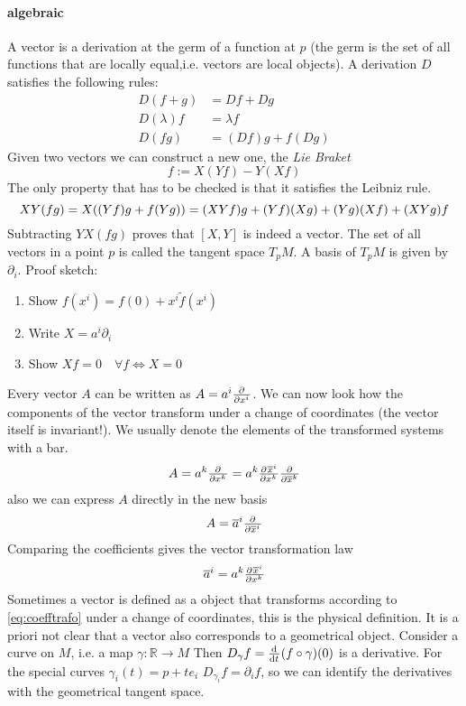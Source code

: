\paragraph{algebraic}
A vector is a derivation at the germ of a function at $p$ 
(the germ is the set of all functions that are locally equal,i.e. vectors are local objects). 
A derivation $D$ satisfies the following rules:
\begin{align*}
    D(f+g) &=Df+Dg\\
    D(\lambda)f&=\lambda f\\
    D(fg)&= (Df)g+f(Dg)
\end{align*}
Given two vectors we can construct a new one, the \emph{Lie Braket}
\begin{equation}
    [X,Y]f:=X(Yf)-Y(Xf)
\end{equation}
The only property that has to be checked is that it satisfies the Leibniz rule.
\begin{equation*}
    XY(fg)=X((Yf)g+f(Yg))=(XYf)g+(Yf)(Xg)+(Yg)(Xf)+(XYg)f\\
\end{equation*}
Subtracting $YX(fg)$ proves that $[X,Y]$ is indeed a vector.
The set of all vectors in a point $p$ is called the tangent space $T_pM$. A basis of $T_pM$ is given by $\partial_i$.
Proof sketch:
\begin{enumerate}
    \item Show $f(x^i)=f(0)+x^i\tilde{f}(x^i)$
    \item Write $X=a^i\partial_i$
    \item Show $Xf=0\quad \forall f \iff X=0$
\end{enumerate}
Every vector $A$ can be written as $A=a^i\pd{}{{x^i}}$. We can now look how the components of the vector transform 
under a change of coordinates (the vector itself is invariant!). We usually denote the elements of the transformed systems with a bar.
\begin{equation}
    A= a^k\pd{}{{x^k}}= a^k\pd{\overline{x}^i}{{x^k}}\pd{}{{\overline{x}^k}}
\end{equation}
also we can express $A$ directly in the new basis
\begin{equation}
    A= \overline{a}^i\pd{}{{\overline{x}^i}}
\end{equation}
Comparing the coefficients gives the vector transformation law
\begin{equation}
    \overline{a}^i=a^k\pd{\overline{x}^i}{{x^k}}\label{eq:coefftrafo}
\end{equation}
Sometimes a vector is defined as a object that transforms according to \ref{eq:coefftrafo} under a change of coordinates, 
this is the physical definition. It is a priori not clear that a vector also corresponds to a geometrical object. 
Consider a curve on $M$, i.e. a map $\gamma:\mathbb{R}\to M$
Then $D_\gamma f=\od{}{t}(f\circ\gamma)(0)$ is a derivative.
For the special curves $\gamma_i(t)=p+te_i$
$D_{\gamma_i} f=\partial_if$, so we can identify the derivatives with the geometrical tangent space.

